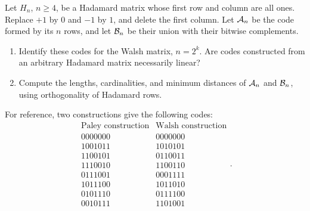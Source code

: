 
\begin{exo}
\label{exo-codes-hadamard}
Let $H_n$, $n\geq4$, be a Hadamard matrix whose first row and column are
all ones. Replace $+1$ by $0$ and $-1$ by $1$, and delete the first column.
Let $\mathcal{A}_n$ be the code formed by its $n$ rows, and let $\mathcal{B}_n$ be their
union with their bitwise complements.
\begin{enumerate}
\item Identify these codes for the Walsh matrix, $n=2^k$. Are codes
constructed from an arbitrary Hadamard matrix necessarily linear?
\item Compute the lengths, cardinalities, and minimum distances of
$\mathcal{A}_n$ and $\mathcal{B}_n$, using orthogonality of Hadamard rows.
\end{enumerate}
For reference, two constructions give the following codes:
\begin{equation}
\label{eq-code-hadamard-a8}
\begin{array}{c|c}
 \text{Paley construction}&\text{Walsh construction}\\\hline
 0000000&0000000\\1001011&1010101\\1100101&0110011\\
 1110010&1100110\\0111001&0001111\\1011100&1011010\\
 0101110&0111100\\0010111&1101001
\end{array}.
\end{equation}
\end{exo}


